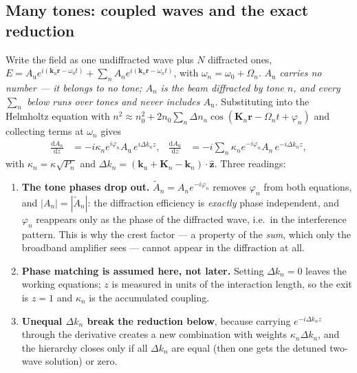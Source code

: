 \documentclass[11pt,a4paper]{article}
\newcommand{\dd}{\mathrm d}
\newcommand{\Au}{\ensuremath{A_\mathrm{u}}}
\begin{document}
\subsection{Many tones: coupled waves and the exact reduction}\label{sec:coupled}
Write the field as one undiffracted wave plus $N$ diffracted ones,
$E=\Au e^{i(\mathbf k_\mathrm u\mathbf r-\omega_0t)}
+\sum_{n}A_ne^{i(\mathbf k_n\mathbf r-\omega_nt)}$, with
$\omega_n=\omega_0+\Omega_n$. \emph{$\Au$ carries no number --- it belongs to
no tone; $A_n$ is the beam diffracted by tone $n$, and every $\sum_n$ below
runs over tones and never includes $\Au$.} Substituting into the Helmholtz
equation with $n^2\approx n_0^2+2n_0\sum_n\Delta n_n\cos(\mathbf K_n\mathbf r
-\Omega_nt+\varphi_n)$ and collecting terms at $\omega_n$ gives
\citep{kogelnik1969,laude2003}
\begin{align}
\frac{\dd A_n}{\dd z}&=-i\kappa_ne^{i\varphi_n}\Au\,e^{i\Delta k_nz},
&\frac{\dd\Au}{\dd z}&=-i\sum_n\kappa_ne^{-i\varphi_n}A_n\,e^{-i\Delta k_nz},
\label{eq:coupledgen}
\end{align}
with $\kappa_n=\kappa\sqrt{P_n}$ and
$\Delta k_n=(\mathbf k_\mathrm u+\mathbf K_n-\mathbf k_n)\cdot\hat{\mathbf z}$.
Three readings:

\begin{enumerate}\itemsep1pt
\item \textbf{The tone phases drop out.} $\tilde A_n=A_ne^{-i\varphi_n}$
      removes $\varphi_n$ from both equations, and $|A_n|=|\tilde A_n|$: the
      diffraction efficiency is \emph{exactly} phase independent, and
      $\varphi_n$ reappears only as the phase of the diffracted wave, i.e.\ in
      the interference pattern. This is why the crest factor --- a property of
      the \emph{sum}, which only the broadband amplifier sees --- cannot appear
      in the diffraction at all.
\item \textbf{Phase matching is assumed here, not later.} Setting
      $\Delta k_n=0$ leaves the working equations; $z$ is measured in units of
      the interaction length, so the exit is $z=1$ and $\kappa_n$ is the
      accumulated coupling.
\item \textbf{Unequal $\Delta k_n$ break the reduction below}, because carrying
      $e^{-i\Delta k_nz}$ through the derivative creates a new combination with
      weights $\kappa_n\Delta k_n$, and the hierarchy closes only if all
      $\Delta k_n$ are equal (then one gets the detuned two-wave solution) or
      zero.
\end{enumerate}
\end{document}
